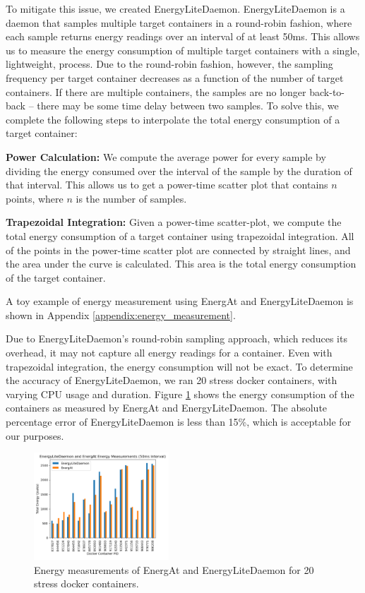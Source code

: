 \documentclass[times, 10pt,twocolumn]{article}
\begin{document}
To mitigate this issue, we created EnergyLiteDaemon. EnergyLiteDaemon is a daemon that samples multiple target containers in a round-robin fashion, where each sample returns energy readings over an interval of at least 50ms. This allows us to measure the energy consumption of multiple target containers with a single, lightweight, process. Due to the round-robin fashion, however, the sampling frequency per target container decreases as a function of the number of target containers. If there are multiple containers, the samples are no longer back-to-back -- there may be some time delay between two samples. To solve this, we complete the following steps to interpolate the total energy consumption of a target container:

\textbf{Power Calculation:} We compute the average power for every sample by dividing the energy consumed over the interval of the sample by the duration of that interval. This allows us to get a power-time scatter plot that contains $n$ points, where $n$ is the number of samples.

\textbf{Trapezoidal Integration:} Given a power-time scatter-plot, we compute the total energy consumption of a target container using trapezoidal integration. All of the points in the power-time scatter plot are connected by straight lines, and the area under the curve is calculated. This area is the total energy consumption of the target container. 

A toy example of energy measurement using EnergAt and EnergyLiteDaemon is shown in Appendix \ref{appendix:energy_measurement}.

Due to EnergyLiteDaemon's round-robin sampling approach, which reduces its overhead, it may not capture all energy readings for a container. Even with trapezoidal integration, the energy consumption will not be exact. To determine the accuracy of EnergyLiteDaemon, we ran 20 stress docker containers, with varying CPU usage and duration. Figure \ref{fig:EnergyLiteDaemon_Efficacy} shows the energy consumption of the containers as measured by EnergAt and EnergyLiteDaemon. The absolute percentage error of EnergyLiteDaemon is less than 15\%, which is acceptable for our purposes.

\begin{figure}[ht]
   \centering
   \includegraphics[width=0.45\textwidth]{imgs/EnergyLiteDaemon_Efficacy.png}
   \caption{Energy measurements of EnergAt and EnergyLiteDaemon for 20 stress docker containers.}
   \label{fig:EnergyLiteDaemon_Efficacy}
 \end{figure}
\end{document}
